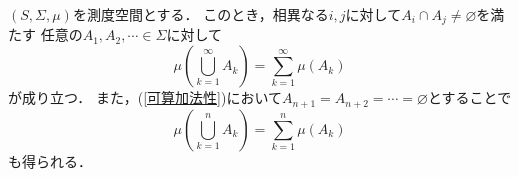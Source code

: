 \documentclass{jsarticle}
\begin{document}
$(S,\Sigma,\mu)$を測度空間とする．
このとき，相異なる$i,j$に対して$A_i\cap A_j\neq\varnothing$を満たす
任意の$A_1,A_2,\cdots\in\Sigma$に対して
\begin{equation}\label{可算加法性}
    \mu\left(\bigcup_{k=1}^\infty A_k\right)=\sum_{k=1}^\infty\mu(A_k)
\end{equation}
が成り立つ．
また，(\ref{可算加法性})において$A_{n+1}=A_{n+2}=\cdots=\varnothing$とすることで
\begin{equation}\label{有限加法性}
    \mu\left(\bigcup_{k=1}^nA_k\right)=\sum_{k=1}^n\mu(A_k)
\end{equation}
も得られる．
\end{document}
